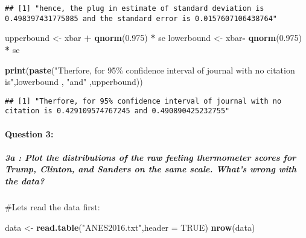 \documentclass[
]{article}
\newenvironment{Shaded}{\begin{snugshade}}{\end{snugshade}}
\newcommand{\AttributeTok}[1]{\textcolor[rgb]{0.13,0.29,0.53}{#1}}
\newcommand{\ConstantTok}[1]{\textcolor[rgb]{0.56,0.35,0.01}{#1}}
\newcommand{\FloatTok}[1]{\textcolor[rgb]{0.00,0.00,0.81}{#1}}
\newcommand{\FunctionTok}[1]{\textcolor[rgb]{0.13,0.29,0.53}{\textbf{#1}}}
\newcommand{\NormalTok}[1]{#1}
\newcommand{\OtherTok}[1]{\textcolor[rgb]{0.56,0.35,0.01}{#1}}
\newcommand{\SpecialCharTok}[1]{\textcolor[rgb]{0.81,0.36,0.00}{\textbf{#1}}}
\newcommand{\StringTok}[1]{\textcolor[rgb]{0.31,0.60,0.02}{#1}}
\begin{document}
\begin{verbatim}
## [1] "hence, the plug in estimate of standard deviation is 0.498397431775085 and the standard error is 0.0157607106438764"
\end{verbatim}

\begin{Shaded}
\begin{Highlighting}[]
\NormalTok{upperbound }\OtherTok{\textless{}{-}}\NormalTok{ xbar }\SpecialCharTok{+} \FunctionTok{qnorm}\NormalTok{(}\FloatTok{0.975}\NormalTok{) }\SpecialCharTok{*}\NormalTok{ se}
\NormalTok{lowerbound }\OtherTok{\textless{}{-}}\NormalTok{ xbar}\SpecialCharTok{{-}} \FunctionTok{qnorm}\NormalTok{(}\FloatTok{0.975}\NormalTok{) }\SpecialCharTok{*}\NormalTok{ se}

\FunctionTok{print}\NormalTok{(}\FunctionTok{paste}\NormalTok{(}\StringTok{"Therfore, for 95\% confidence interval of journal with no citation is"}\NormalTok{,lowerbound , }\StringTok{"and"}\NormalTok{ ,upperbound))}
\end{Highlighting}
\end{Shaded}

\begin{verbatim}
## [1] "Therfore, for 95% confidence interval of journal with no citation is 0.429109574767245 and 0.490890425232755"
\end{verbatim}

\hypertarget{question-3}{%
\paragraph{Question 3:}\label{question-3}}

\hypertarget{a-plot-the-distributions-of-the-raw-feeling-thermometer-scores-for-trump-clinton-and-sanders-on-the-same-scale.-whats-wrong-with-the-data}{%
\subparagraph{3a : Plot the distributions of the raw feeling thermometer
scores for Trump, Clinton, and Sanders on the same scale. What's wrong
with the
data?}\label{a-plot-the-distributions-of-the-raw-feeling-thermometer-scores-for-trump-clinton-and-sanders-on-the-same-scale.-whats-wrong-with-the-data}}

\#Lets read the data first:

\begin{Shaded}
\begin{Highlighting}[]
\NormalTok{data }\OtherTok{\textless{}{-}} \FunctionTok{read.table}\NormalTok{(}\StringTok{"ANES2016.txt"}\NormalTok{,}\AttributeTok{header =} \ConstantTok{TRUE}\NormalTok{)}
\FunctionTok{nrow}\NormalTok{(data)}
\end{Highlighting}
\end{Shaded}
\end{document}
